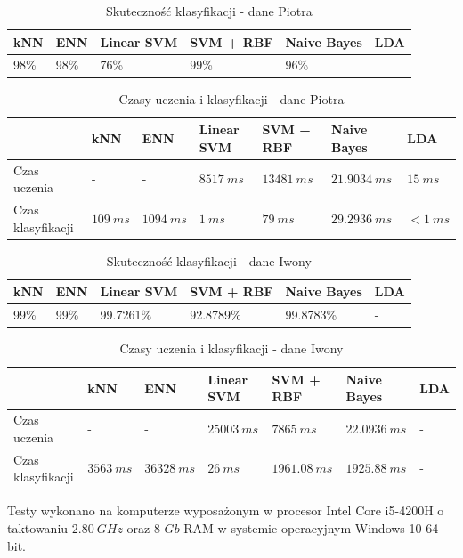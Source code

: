 \documentclass[[10pt,a4paper]{article}
\begin{document}
\begin{table}[h]
\centering
\caption{Skuteczność klasyfikacji - dane Piotra}
\label{accuracyTable1}
\begin{tabular}{|l|l|l|l|l|l|}
\hline
kNN & ENN & Linear SVM & SVM + RBF & Naive Bayes & LDA \\ \hline
  98\%   &  98\%  & 76\%       & 99\%      & 96\%        &     \\ \hline
\end{tabular}
\end{table}

\begin{table}[h]
\centering
\caption{Czasy uczenia i klasyfikacji - dane Piotra}
\label{timesTable1}
\begin{tabular}{l|l|l|l|l|l|l|}
\cline{2-7}
                                        & kNN & ENN & Linear SVM & SVM + RBF & Naive Bayes & LDA \\ \hline
\multicolumn{1}{|l|}{Czas uczenia}      &  -  &  -   &  $8517\: ms$   &   $13481\: ms$   &   $21.9034\: ms$ & $15\: ms$    \\ \hline
\multicolumn{1}{|l|}{Czas klasyfikacji} &  $109 \: ms$   &   $1094\: ms$   &   $1\: ms$  &      $79\: ms$     &     $29.2936\: ms$        & $< 1\: ms$  \\ \hline
\end{tabular}
\end{table}


\begin{table}[h]
\centering
\caption{Skuteczność klasyfikacji - dane Iwony}
\label{accuracyTable2}
\begin{tabular}{|l|l|l|l|l|l|}
\hline
kNN & ENN & Linear SVM & SVM + RBF & Naive Bayes & LDA \\ \hline
  99\%   &  99\%  & 99.7261\%       & 92.8789\%      & 99.8783\%        &   -  \\ \hline
\end{tabular}
\end{table}

\begin{table}[h]
\centering
\caption{Czasy uczenia i klasyfikacji  - dane Iwony}
\label{timesTable2}
\begin{tabular}{l|l|l|l|l|l|l|}
\cline{2-7}
                                        & kNN & ENN & Linear SVM & SVM + RBF & Naive Bayes & LDA \\ \hline
\multicolumn{1}{|l|}{Czas uczenia}      &  -  &  -   &  $25003\: ms$   &   $7865\: ms$   &   $22.0936 \: ms$ & -    \\ \hline
\multicolumn{1}{|l|}{Czas klasyfikacji} &  $3563 \: ms$   &   $36328\: ms$   &   $26\: ms$  &      $1961.08\: ms$     &     $1925.88\: ms$        & - \\ \hline
\end{tabular}
\end{table}


Testy wykonano na komputerze wyposażonym w procesor Intel Core i5-4200H o taktowaniu $2.80 \: GHz$ oraz 8 $Gb$ RAM w systemie operacyjnym Windows 10 64-bit.
\end{document}
